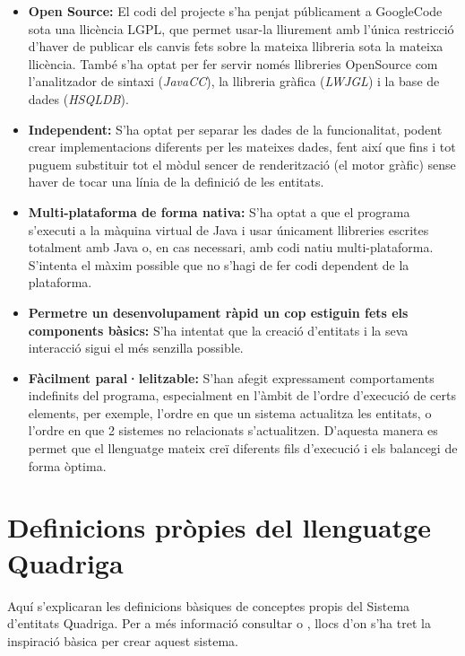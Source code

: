   \begin{itemize}
    \item {\bf Open Source:} El codi del projecte s'ha penjat públicament a GoogleCode sota una llicència LGPL, que permet usar-la lliurement amb l'única restricció d'haver de publicar els canvis fets sobre la mateixa llibreria sota la mateixa llicència. També s'ha optat per fer servir només llibreries OpenSource com l'analitzador de sintaxi ({\em JavaCC}), la llibreria gràfica ({\em LWJGL}) i la base de dades ({\em HSQLDB}).
      
    \item {\bf Independent:} S'ha optat per separar les dades de la funcionalitat, podent crear implementacions diferents per les mateixes dades, fent així que fins i tot puguem substituir tot el mòdul sencer de renderització (el motor gràfic) sense haver de tocar una línia de la definició de les entitats.
      
    \item {\bf Multi-plataforma de forma nativa:} S'ha optat a que el programa s'executi a la màquina virtual de Java i usar únicament llibreries escrites totalment amb Java o, en cas necessari, amb codi natiu multi-plataforma. S'intenta el màxim possible que no s'hagi de fer codi dependent de la plataforma.
      
    \item {\bf Permetre un desenvolupament ràpid un cop estiguin fets els components bàsics:} S'ha intentat que la creació d'entitats i la seva interacció sigui el més senzilla possible.
      
    \item {\bf Fàcilment paral·lelitzable:} S'han afegit expressament comportaments indefinits del programa, especialment en l'àmbit de l'ordre d'execució de certs elements, per exemple, l'ordre en que un sistema actualitza les entitats, o l'ordre en que 2 sistemes no relacionats s'actualitzen. D'aquesta manera es permet que el llenguatge mateix creï diferents fils d'execució i els balancegi de forma òptima.
  \end{itemize}
  
\section{Definicions pròpies del llenguatge Quadriga}

  Aquí s'explicaran les definicions bàsiques de conceptes propis del Sistema d'entitats Quadriga. Per a més informació consultar \cite{EntityWikiB} o \cite{Martin07}, llocs d'on s'ha tret la inspiració bàsica per crear aquest sistema.

